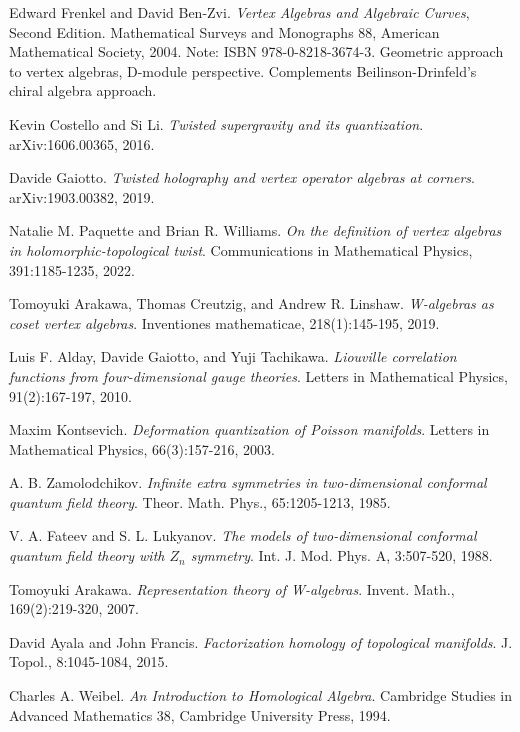 \begin{thebibliography}{99}
Edward Frenkel and David Ben-Zvi.
\textit{Vertex Algebras and Algebraic Curves}, Second Edition.
Mathematical Surveys and Monographs 88, American Mathematical Society, 2004.
Note: ISBN 978-0-8218-3674-3. Geometric approach to vertex algebras, D-module perspective. 
Complements Beilinson-Drinfeld's chiral algebra approach.


Kevin Costello and Si Li.
\textit{Twisted supergravity and its quantization}.
arXiv:1606.00365, 2016.

Davide Gaiotto.
\textit{Twisted holography and vertex operator algebras at corners}.
arXiv:1903.00382, 2019.

Natalie M. Paquette and Brian R. Williams.
\textit{On the definition of vertex algebras in holomorphic-topological twist}.
Communications in Mathematical Physics, 391:1185-1235, 2022.

Tomoyuki Arakawa, Thomas Creutzig, and Andrew R. Linshaw.
\textit{W-algebras as coset vertex algebras}.
Inventiones mathematicae, 218(1):145-195, 2019.

Luis F. Alday, Davide Gaiotto, and Yuji Tachikawa.
\textit{Liouville correlation functions from four-dimensional gauge theories}.
Letters in Mathematical Physics, 91(2):167-197, 2010.

Maxim Kontsevich.
\textit{Deformation quantization of Poisson manifolds}.
Letters in Mathematical Physics, 66(3):157-216, 2003.

A. B. Zamolodchikov.
\textit{Infinite extra symmetries in two-dimensional conformal quantum field theory}.
Theor. Math. Phys., 65:1205-1213, 1985.

V. A. Fateev and S. L. Lukyanov.
\textit{The models of two-dimensional conformal quantum field theory with $Z_n$ symmetry}.
Int. J. Mod. Phys. A, 3:507-520, 1988.

Tomoyuki Arakawa.
\textit{Representation theory of W-algebras}.
Invent. Math., 169(2):219-320, 2007.

David Ayala and John Francis.
\textit{Factorization homology of topological manifolds}.
J. Topol., 8:1045-1084, 2015.

Charles A. Weibel.
\textit{An Introduction to Homological Algebra}.
Cambridge Studies in Advanced Mathematics 38, Cambridge University Press, 1994.


\end{thebibliography}
